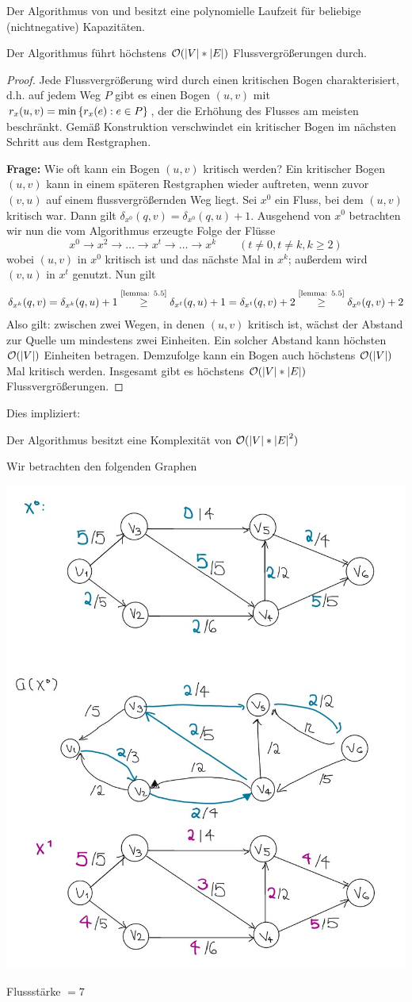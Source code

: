 Der Algorithmus von  und  besitzt eine polynomielle Laufzeit für beliebige (nichtnegative) Kapazitäten.

\begin{lemma}
	Der Algorithmus führt höchstens $\mathcal{O}(\left| V \right| * \left| E \right|)$ Flussvergrößerungen durch.
\end{lemma}
\begin{proof}
	Jede Flussvergrößerung wird durch einen kritischen Bogen charakterisiert, d.h. auf jedem Weg $P$ gibt es einen Bogen $(u,v)$ mit $r_x(u,v) = \min\left\{ r_x(e) : e \in P \right\}$, der die Erhöhung des Flusses am meisten beschränkt. Gemäß Konstruktion verschwindet ein kritischer Bogen im nächsten Schritt aus dem Restgraphen.

	\textbf{Frage:} Wie oft kann ein Bogen $(u,v)$ kritisch werden?
	Ein kritischer Bogen $(u,v)$ kann in einem späteren Restgraphen wieder auftreten, wenn zuvor $(v,u)$ auf einem flussvergrößernden Weg liegt. Sei $x^0$ ein Fluss, bei dem $(u,v)$ kritisch war. Dann gilt $\delta_{x^0}(q,v) = \delta_{x^0}(q,u) + 1$. Ausgehend von $x^0$ betrachten wir nun die vom Algorithmus erzeugte Folge der Flüsse
	\begin{equation*}
		x^0 \to x^2 \to \dots \to x^t \to \dots \to x^k \qquad (t \neq 0, t \neq k, k \ge 2)
	\end{equation*}
	wobei $(u,v)$ in $x^0$ kritisch ist und das nächste Mal in $x^k$; außerdem wird $(v,u)$ in $x^t$ genutzt. Nun gilt
	\begin{equation*}
		\begin{aligned}
		\delta_{x^k}(q,v) = \delta_{x^k}(q,u) + 1 \overset{\text{\cref{lemma: 5.5}}}{\ge} \delta_{x^t}(q,u) + 1 = \delta_{x^t}(q,v) + 2 \overset{\text{\cref{lemma: 5.5}}}{\ge} \delta_{x^0}(q,v) + 2
		\end{aligned}
	\end{equation*}
	Also gilt: zwischen zwei Wegen, in denen $(u,v)$ kritisch ist, wächst der Abstand zur Quelle um mindestens zwei Einheiten. Ein solcher Abstand kann höchsten $\mathcal{O}(\left| V \right|)$ Einheiten betragen. Demzufolge kann ein Bogen auch höchstens $\mathcal{O}(\left| V \right|)$ Mal kritisch werden. Insgesamt gibt es höchstens $\mathcal{O}(\left| V \right| * \left| E \right|)$ Flussvergrößerungen.
\end{proof}

Dies impliziert:
\begin{aussage}
	Der Algorithmus besitzt eine Komplexität von $\mathcal{O}(\left| V \right| * \left| E \right|^2)$
\end{aussage}

\begin{beispiel}
Wir betrachten den folgenden Graphen

	\includegraphics[width=.3\linewidth]{./img/optinum_5_4_bsp5-5.jpg}

Flussstärke $= 7$
\end{beispiel}